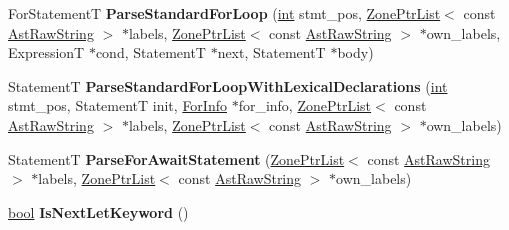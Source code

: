 \begin{DoxyCompactItemize}
\item 
\mbox{\label{classv8_1_1internal_1_1ParserBase_a65073d102fd077b9e2b96474bd7d6f4f}} 
For\+StatementT {\bfseries Parse\+Standard\+For\+Loop} (\mbox{\hyperlink{classint}{int}} stmt\+\_\+pos, \mbox{\hyperlink{classv8_1_1internal_1_1ZoneList}{Zone\+Ptr\+List}}$<$ const \mbox{\hyperlink{classv8_1_1internal_1_1AstRawString}{Ast\+Raw\+String}} $>$ $\ast$labels, \mbox{\hyperlink{classv8_1_1internal_1_1ZoneList}{Zone\+Ptr\+List}}$<$ const \mbox{\hyperlink{classv8_1_1internal_1_1AstRawString}{Ast\+Raw\+String}} $>$ $\ast$own\+\_\+labels, ExpressionT $\ast$cond, StatementT $\ast$next, StatementT $\ast$body)
\item 
\mbox{\label{classv8_1_1internal_1_1ParserBase_a8bcd1d3810e988c24c666f66fd9bf7d0}} 
StatementT {\bfseries Parse\+Standard\+For\+Loop\+With\+Lexical\+Declarations} (\mbox{\hyperlink{classint}{int}} stmt\+\_\+pos, StatementT init, \mbox{\hyperlink{structv8_1_1internal_1_1ParserBase_1_1ForInfo}{For\+Info}} $\ast$for\+\_\+info, \mbox{\hyperlink{classv8_1_1internal_1_1ZoneList}{Zone\+Ptr\+List}}$<$ const \mbox{\hyperlink{classv8_1_1internal_1_1AstRawString}{Ast\+Raw\+String}} $>$ $\ast$labels, \mbox{\hyperlink{classv8_1_1internal_1_1ZoneList}{Zone\+Ptr\+List}}$<$ const \mbox{\hyperlink{classv8_1_1internal_1_1AstRawString}{Ast\+Raw\+String}} $>$ $\ast$own\+\_\+labels)
\item 
\mbox{\label{classv8_1_1internal_1_1ParserBase_ac862cdd6e2154202c1744b72fb98a6b2}} 
StatementT {\bfseries Parse\+For\+Await\+Statement} (\mbox{\hyperlink{classv8_1_1internal_1_1ZoneList}{Zone\+Ptr\+List}}$<$ const \mbox{\hyperlink{classv8_1_1internal_1_1AstRawString}{Ast\+Raw\+String}} $>$ $\ast$labels, \mbox{\hyperlink{classv8_1_1internal_1_1ZoneList}{Zone\+Ptr\+List}}$<$ const \mbox{\hyperlink{classv8_1_1internal_1_1AstRawString}{Ast\+Raw\+String}} $>$ $\ast$own\+\_\+labels)
\item 
\mbox{\label{classv8_1_1internal_1_1ParserBase_a821dce8e1437c7d56b43b632b2a116cd}} 
\mbox{\hyperlink{classbool}{bool}} {\bfseries Is\+Next\+Let\+Keyword} ()
\item 
\mbox{\label{classv8_1_1internal_1_1ParserBase_a23fe8f9f34b88b059e74f8fe790cc0e8}} 

\end{DoxyCompactItemize}
